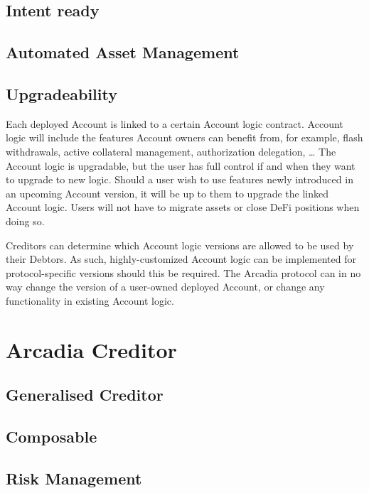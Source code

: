 \documentclass[sigconf,nonacm]{acmart}
\begin{document}
\subsection{Intent ready}

\subsection{Automated Asset Management}

\subsection{Upgradeability}
Each deployed Account is linked to a certain Account logic contract.
Account logic will include the features Account owners can benefit from, for example, flash withdrawals, active collateral management, authorization delegation, … 
The Account logic is upgradable, but the user has full control if and when they want to upgrade to new logic.
Should a user wish to use features newly introduced in an upcoming Account version, it will be up to them to upgrade the linked Account logic.
Users will not have to migrate assets or close DeFi positions when doing so. 

Creditors can determine which Account logic versions are allowed to be used by their Debtors.
As such, highly-customized Account logic can be implemented for protocol-specific versions should this be required. 
The Arcadia protocol can in no way change the version of a user-owned deployed Account, or change any functionality in existing Account logic.

\section{Arcadia Creditor}
\label{sec:arcadia-creditor}

\subsection{Generalised Creditor}

\subsection{Composable}

\subsection{Risk Management}
\end{document}
